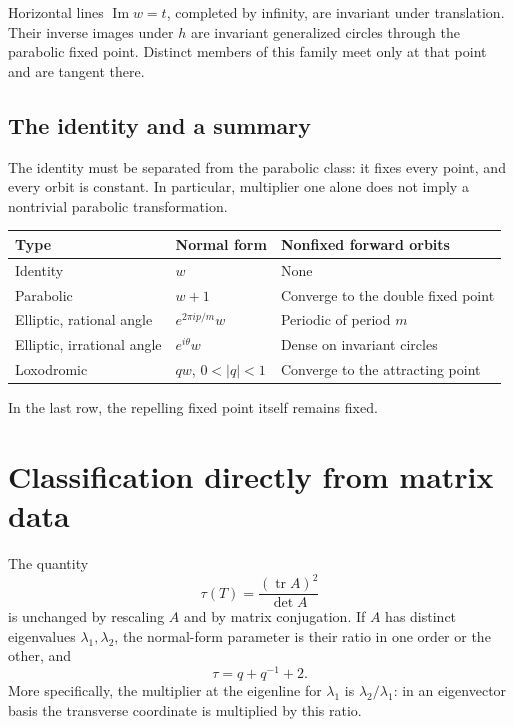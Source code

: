 \documentclass[11pt,a4paper]{article}
\newcommand{\abs}[1]{\left|#1\right|}
\DeclareMathOperator{\tr}{tr}
\theoremstyle{plain}
\theoremstyle{definition}
\theoremstyle{remark}
\begin{document}
Horizontal lines $\operatorname{Im}w=t$, completed by infinity, are
invariant under translation. Their inverse images under $h$ are invariant
generalized circles through the parabolic fixed point. Distinct members
of this family meet only at that point and are tangent there.

\subsection{The identity and a summary}

The identity must be separated from the parabolic class: it fixes every
point, and every orbit is constant. In particular, multiplier one alone
does not imply a nontrivial parabolic transformation.

\begin{center}
\small
\begin{tabular}{@{}lll@{}}
\toprule
Type & Normal form & Nonfixed forward orbits \\
\midrule
Identity & $w$ & None \\
Parabolic & $w+1$ & Converge to the double fixed point \\
Elliptic, rational angle & $e^{2\pi ip/m}w$ & Periodic of period $m$ \\
Elliptic, irrational angle & $e^{i\theta}w$ & Dense on invariant circles \\
Loxodromic & $qw$, $0<\abs{q}<1$ & Converge to the attracting point \\
\bottomrule
\end{tabular}
\end{center}
In the last row, the repelling fixed point itself remains fixed.

\section{Classification directly from matrix data}

The quantity
\begin{equation}\label{eq:tau}
  \tau(T)=\frac{(\tr A)^2}{\det A}
\end{equation}
is unchanged by rescaling $A$ and by matrix conjugation. If $A$ has
distinct eigenvalues $\lambda_1,\lambda_2$, the normal-form parameter is
their ratio in one order or the other, and
\begin{equation}\label{eq:traceq}
  \tau=q+q^{-1}+2.
\end{equation}
More specifically, the multiplier at the eigenline for $\lambda_1$ is
$\lambda_2/\lambda_1$: in an eigenvector basis the transverse coordinate
is multiplied by this ratio.
\end{document}
